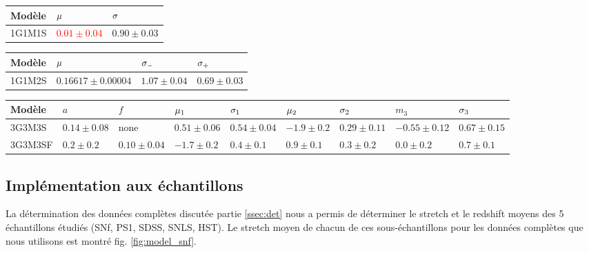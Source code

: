 \documentclass[a4paper, 12pt, svgnames]{article}
\begin{document}
\begin{table}[htbp!]
\begin{tabularx}{\linewidth}{|Y*{6}{|Y}|}
    \end{tabularx} \bigbreak

\begin{tabularx}{\linewidth}{|Y*{2}{|Y}|}\hline

     Modèle & $\mu$ & $\sigma$ \\\hline\hline

    1G1M1S & \textcolor{red}{$0.01 \pm 0.04$} & $0.90 \pm 0.03$ \\\hline

\end{tabularx} \bigbreak

\begin{tabularx}{\linewidth}{|Y*{3}{|Y}|}\hline

     Modèle & $\mu$ & $\sigma_-$ & $\sigma_+$ \\\hline\hline

    1G1M2S & $0.16617 \pm 0.00004$ & $1.07 \pm 0.04$ & $0.69 \pm 0.03$ \\\hline

\end{tabularx} \bigbreak

\begin{tabularx}{\linewidth}{|Y*{8}{|Y}|}\hline

     Modèle & $a$ & $f$ & $\mu_1$ & $\sigma_1$ & $\mu_2$ & $\sigma_2$ &
    $m_3$ & $\sigma_3$ \\\hline\hline

    3G3M3S & $0.14 \pm 0.08$ & none & $0.51 \pm 0.06$ & $0.54 \pm 0.04$ & $-1.9
    \pm 0.2$ & $0.29 \pm 0.11$ & $-0.55 \pm 0.12$ & $0.67 \pm 0.15$ \\\hline
    
    3G3M3SF & $0.2 \pm 0.2 $ & $0.10 \pm 0.04 $ & $-1.7 \pm 0.2$ & $0.4 \pm 0.1$
            & $0.9 \pm 0.1$ & $0.3 \pm 0.2$ & $0.0 \pm 0.2$ & $0.7 \pm 0.1$
            \\\hline

\end{tabularx} \bigbreak

\end{table}

\subsection{Implémentation aux échantillons}\label{ssec:model}

La détermination des données complètes discutée partie \ref{ssec:det} nous a
permis de déterminer le stretch et le redshift moyens des 5 échantillons étudiés
(SNf, PS1, SDSS, SNLS, HST). Le stretch moyen de chacun de ces sous-échantillons
pour les données complètes que nous utilisons est montré fig.
\ref{fig:model_snf}. \bigbreak
\end{document}
